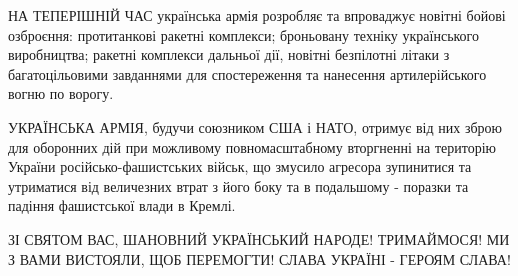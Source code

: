 НА ТЕПЕРІШНІЙ ЧАС українська армія розробляє та впроваджує новітні бойові
озброєння: протитанкові ракетні комплекси; броньовану техніку українського
виробництва; ракетні комплекси дальньої дії, новітні безпілотні літаки з
багатоцільовими завданнями для спостереження та нанесення артилерійського вогню
по ворогу. 

УКРАЇНСЬКА АРМІЯ, будучи союзником США і НАТО, отримує від
них зброю для оборонних дій при можливому повномасштабному
вторгненні на територію України російсько-фашистських військ,
що змусило агресора зупинитися та утриматися від величезних
втрат з його боку та в подальшому - поразки та падіння
фашистської влади в Кремлі. 

ЗІ СВЯТОМ ВАС, ШАНОВНИЙ УКРАЇНСЬКИЙ НАРОДЕ! ТРИМАЙМОСЯ! МИ З ВАМИ
ВИСТОЯЛИ, ЩОБ ПЕРЕМОГТИ! СЛАВА УКРАЇНІ - ГЕРОЯМ СЛАВА!

